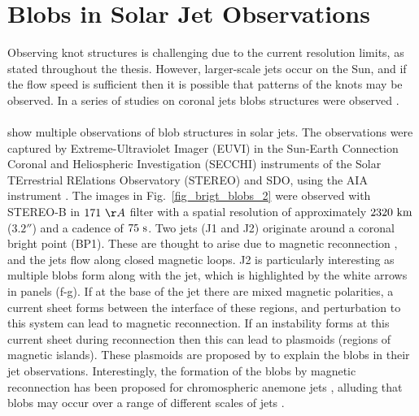 \documentclass[12pt]{ociamthesis}
\newcommand{\np}{\\ \\}
\begin{document}
\section{Blobs in Solar Jet Observations}
\label{sec:EUV_jets}
Observing knot structures is challenging due to the current resolution limits, as stated throughout the thesis. However, larger-scale jets occur on the Sun, and if the flow speed is sufficient then it is possible that patterns of the knots may be observed. In a series of studies on coronal jets blobs structures were observed \citep{Zhang2014AA567A11Z, Zhang2016SoPh291859Z, Chen2015ApJ81571C, Chen2017ApJ84054C}.  \np
%
\cite{Zhang2016SoPh291859Z} show multiple observations of blob structures in solar jets. The observations were captured by Extreme-Ultraviolet Imager (EUVI) in the Sun-Earth Connection Coronal and Heliospheric Investigation (SECCHI) \citep{Howard2008SSRv13667H} instruments of the Solar TErrestrial RElations Observatory (STEREO) \citep{Kaiser2005AdSpR361483K} and SDO, using the AIA instrument \citep{Lemen2012SoPh27517L}. The images in Fig.~\ref{fig_brigt_blobs_2} were observed with STEREO-B in $171~\AA$ filter with a spatial resolution of approximately $2320~\rm{km}$ ($\ang{;;3.2}$) and a cadence of $75~\rm{s}$. Two jets (J1 and J2) originate around a coronal bright point (BP1). These are thought to arise due to magnetic reconnection \citep{Priest1994ApJ427459P, Mandrini1996SoPh168115M, Longcope1998ApJ507433L, Santos2007ASTRA329S}, and the jets flow along closed magnetic loops. J2 is particularly interesting as multiple blobs form along with the jet, which is highlighted by the white arrows in panels (f-g). If at the base of the jet there are mixed magnetic polarities, a current sheet forms between the interface of these regions, and perturbation to this system can lead to magnetic reconnection. If an instability forms at this current sheet during reconnection then this can lead to plasmoids (regions of magnetic islands)\citep{Drake2006Natur443553D}. These plasmoids are proposed by \cite{Zhang2016SoPh291859Z} to explain the blobs in their jet observations. Interestingly, the formation of the blobs by magnetic reconnection has been proposed for chromospheric anemone jets \citep{Singh2012ApJ75933S}, alluding that blobs may occur over a range of different scales of jets \citep{Zhang2016SoPh291859Z}.\np 
\end{document}
